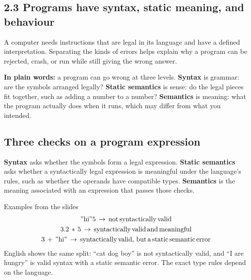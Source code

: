 \documentclass[11pt]{article}
\begin{document}
\begin{keepsection}
\section{2.3 Programs have syntax, static meaning, and behaviour}

A computer needs instructions that are legal in its language and have a defined interpretation. Separating the kinds of errors helps explain why a program can be rejected, crash, or run while still giving the wrong answer.

\begin{plainbox}\textbf{In plain words:} a program can go wrong at three levels. \textbf{Syntax} is grammar: are the symbols arranged legally? \textbf{Static semantics} is sense: do the legal pieces fit together, such as adding a number to a number? \textbf{Semantics} is meaning: what the program actually does when it runs, which may differ from what you intended.\end{plainbox}

\begin{keepsection}
\subsection{Three checks on a program expression}

\textbf{Syntax} asks whether the symbols form a legal expression. \textbf{Static semantics} asks whether a syntactically legal expression is meaningful under the language's rules, such as whether the operands have compatible types. \textbf{Semantics} is the meaning associated with an expression that passes those checks.

\begin{equationcard}{Examples from the slides}
\[ \begin{gathered} "\text{hi}"5\, \to \, \text{not}\, \text{syntactically}\, \text{valid} \\ 3.2\, *\, 5\, \to \, \text{syntactically}\, \text{valid}\, \text{and}\, \text{meaningful} \\ 3\, +\, "\text{hi}"\, \to \, \text{syntactically}\, \text{valid},\, \text{but}\, \mathrm{a}\, \text{static}\, \text{semantic}\, \text{error} \end{gathered} \]
{\small English shows the same split: “cat dog boy” is not syntactically valid, and “I are hungry” is valid syntax with a static semantic error. The exact type rules depend on the language.}
\end{equationcard}


\end{keepsection}
\end{keepsection}
\end{document}
